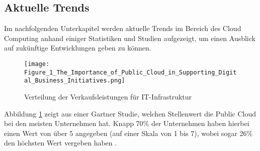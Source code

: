 \subsection{Aktuelle Trends}
Im nachfolgenden Unterkapitel werden aktuelle Trends im Bereich des Cloud Computing anhand einiger Statistiken und Studien aufgezeigt, um einen Ausblick auf zukünftige Entwicklungen geben zu können.

\begin{figure}[H]
    \texttt{[image: Figure\_1\_The\_Importance\_of\_Public\_Cloud\_in\_Supporting\_Digital\_Business\_Initiatives.png]}
    \caption{Verteilung der Verkaufsleistungen für IT-Infrastruktur \cite[S. 2]{Ganly2022}}
    \label{fig:importance}
\end{figure}

Abbildung \ref{fig:importance} zeigt aus einer Gartner Studie, welchen Stellenwert die Public Cloud bei den meisten Unternehmen hat. Knapp 70\% der Unternehmen haben hierbei einen Wert von über 5 angegeben (auf einer Skala von 1 bis 7), wobei sogar 26\% den höchsten Wert vergeben haben \cite[Vgl.][S. 2]{Ganly2022}. 

\pagebreak